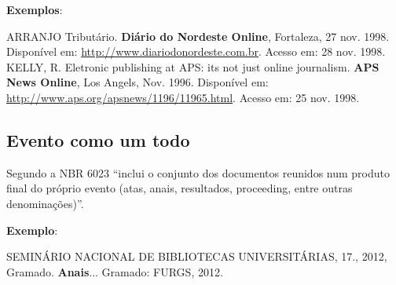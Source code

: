 \begin{flushleft}
\begin{singlespace}
\end{singlespace}
\end{flushleft}

\begin{exemplomanual}
\textbf{Exemplos}:\\
\begin{singlespace}
ARRANJO Tributário. \textbf{Diário do Nordeste Online}, Fortaleza, 27 nov. 1998. Disponível em: \url{http://www.diariodonordeste.com.br}. Acesso
em: 28 nov. 1998.
\newline
\newline
KELLY, R. Eletronic publishing at APS: its not just online journalism. \textbf{APS News Online}, Los Angels, Nov. 1996. Disponível em: \url{http://www.aps.org/apsnews/1196/11965.html}. Acesso em: 25 nov.
1998.
\end{singlespace}
\end{exemplomanual}


\subsection{Evento como um todo}

Segundo a NBR 6023 \cite[p.7]{NBR6023:2002} ``inclui o conjunto dos documentos reunidos num produto final do próprio evento (atas, anais, resultados, proceeding, entre outras denominações)''. 

\begin{flushleft}
\begin{singlespace}
\end{singlespace}
\end{flushleft}

\begin{exemplomanual}
\textbf{Exemplo}:\\
\begin{singlespace}
SEMINÁRIO NACIONAL DE BIBLIOTECAS UNIVERSITÁRIAS, 17., 2012, Gramado. \textbf{Anais}... Gramado: FURGS, 2012.
\end{singlespace}
\end{exemplomanual}


